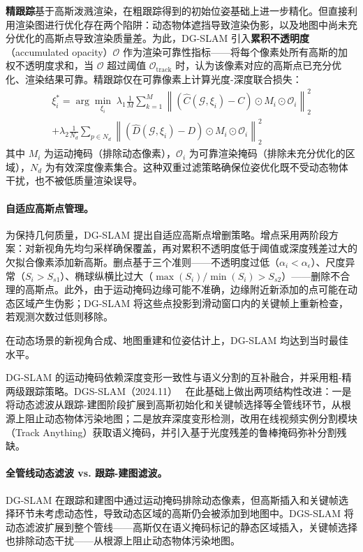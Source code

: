 \textbf{精跟踪}基于高斯泼溅渲染，在粗跟踪得到的初始位姿基础上进一步精化。但直接利用渲染图进行优化存在两个陷阱：动态物体遮挡导致渲染伪影，以及地图中尚未充分优化的高斯点导致渲染质量差。为此，DG-SLAM 引入\textbf{累积不透明度}（accumulated opacity）$\mathcal{O}$ 作为渲染可靠性指标——将每个像素处所有高斯的加权不透明度求和，当 $\mathcal{O}$ 超过阈值 $\mathcal{O}_{\mathrm{track}}$ 时，认为该像素对应的高斯点已充分优化、渲染结果可靠。精跟踪仅在可靠像素上计算光度-深度联合损失：
\begin{multline}
    \xi_i^* = \arg\min_{\xi_i} \; \lambda_1 \frac{1}{M} \sum_{k=1}^{M} \left\| \left(\hat{C}(\mathcal{G}, \xi_i) - C\right) \odot M_i \odot \mathcal{O}_i \right\|_2^2 \\
    + \lambda_2 \frac{1}{N_d} \sum_{p \in N_d} \left\| \left(\hat{D}(\mathcal{G}, \xi_i) - D\right) \odot M_i \odot \mathcal{O}_i \right\|_2^2
\end{multline}
其中 $M_i$ 为运动掩码（排除动态像素），$\mathcal{O}_i$ 为可靠渲染掩码（排除未充分优化的区域），$N_d$ 为有效深度像素集合。这种双重过滤策略确保位姿优化既不受动态物体干扰，也不被低质量渲染误导。

\paragraph{自适应高斯点管理。}
为保持几何质量，DG-SLAM 提出自适应高斯点增删策略。增点采用两阶段方案：对新视角先均匀采样确保覆盖，再对累积不透明度低于阈值或深度残差过大的欠拟合像素添加新高斯。删点基于三个准则——不透明度过低（$\alpha_i < \alpha_\epsilon$）、尺度异常（$S_i > S_{s1}$）、椭球纵横比过大（$\max(S_i)/\min(S_i) > S_{s2}$）——删除不合理的高斯点。此外，由于运动掩码边缘可能不准确，边缘附近新添加的点可能在动态区域产生伪影；DG-SLAM 将这些点投影到滑动窗口内的关键帧上重新检查，若观测次数过低则移除。

在动态场景的新视角合成、地图重建和位姿估计上，DG-SLAM 均达到当时最佳水平。

DG-SLAM 的运动掩码依赖深度变形一致性与语义分割的互补融合，并采用粗-精两级跟踪策略。DGS-SLAM（2024.11）~\cite{2411_10722} 在此基础上做出两项结构性改进：一是将动态滤波从跟踪-建图阶段扩展到高斯初始化和关键帧选择等全管线环节，从根源上阻止动态物体污染地图；二是放弃深度变形检测，改用在线视频实例分割模块（Track Anything）获取语义掩码，并引入基于光度残差的鲁棒掩码弥补分割残缺。

\paragraph{全管线动态滤波 vs. 跟踪-建图滤波。}DG-SLAM 在跟踪和建图中通过运动掩码排除动态像素，但高斯插入和关键帧选择环节未考虑动态性，导致动态区域的高斯仍会被添加到地图中。DGS-SLAM 将动态滤波扩展到整个管线——高斯仅在语义掩码标记的静态区域插入，关键帧选择也排除动态干扰——从根源上阻止动态物体污染地图。

